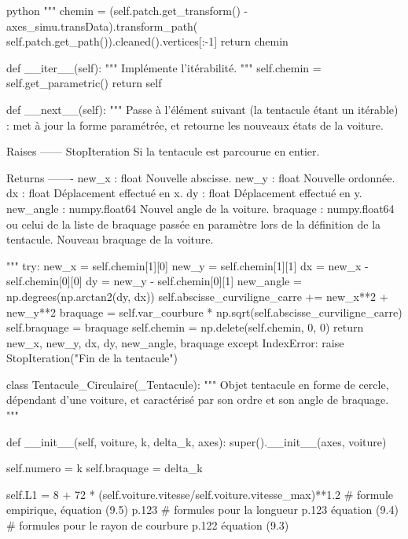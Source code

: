 \begin{mintedbox}{python}
        """
        chemin = (self.patch.get_transform() - axes_simu.transData).transform_path( self.patch.get_path()).cleaned().vertices[:-1]
        return chemin

    def __iter__(self):
        """
        Implémente l'itérabilité.
        """
        self.chemin = self.get_parametric()
        return self

    def __next__(self):
        """
        Passe à l'élément suivant (la tentacule étant un itérable) : met à jour la forme paramétrée, et retourne les nouveaux états de la voiture.

        Raises
        ------
        StopIteration
            Si la tentacule est parcourue en entier.

        Returns
        -------
        new_x : float
            Nouvelle abscisse.
        new_y : float
            Nouvelle ordonnée.
        dx : float
            Déplacement effectué en x.
        dy : float
            Déplacement effectué en y.
        new_angle : numpy.float64
            Nouvel angle de la voiture.
        braquage : numpy.float64 ou celui de la liste de braquage passée en paramètre lors de la définition de la tentacule.
            Nouveau braquage de la voiture.

        """
        try:
            new_x = self.chemin[1][0]
            new_y = self.chemin[1][1]
            dx = new_x - self.chemin[0][0]
            dy = new_y - self.chemin[0][1]
            new_angle = np.degrees(np.arctan2(dy, dx))
            self.abscisse_curviligne_carre += new_x**2 + new_y**2
            braquage = self.var_courbure * np.sqrt(self.abscisse_curviligne_carre)
            self.braquage = braquage
            self.chemin = np.delete(self.chemin, 0, 0)
            return new_x, new_y, dx, dy, new_angle, braquage
        except IndexError:
            raise StopIteration("Fin de la tentacule")


class Tentacule_Circulaire(_Tentacule):
    """
    Objet tentacule en forme de cercle, dépendant d'une voiture, et caractérisé par son ordre et son angle de braquage.
    """

    def __init__(self, voiture, k, delta_k, axes):
        super().__init__(axes, voiture)

        self.numero = k
        self.braquage = delta_k

        self.L1 = 8 + 72 * (self.voiture.vitesse/self.voiture.vitesse_max)**1.2  # formule empirique, équation (9.5) p.123
        # formules pour la longueur p.123 équation (9.4)
        # formules pour le rayon de courbure p.122 équation (9.3)


\end{mintedbox}

